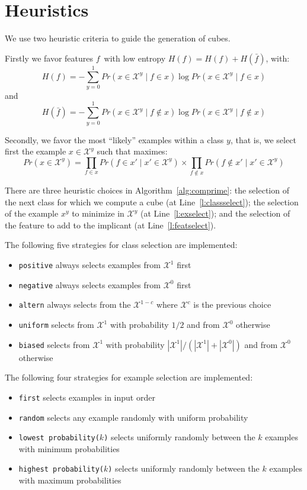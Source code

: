 \documentclass{article}
\newcommand{\setex}[1]{\ensuremath{{\mathcal X}^{#1}}\xspace}
\newcommand{\posex}{{\setex{1}}\xspace}
\newcommand{\negex}{{\setex{0}}\xspace}
\newcommand{\feat}{\ensuremath{f}}
\newcommand{\var}{\ensuremath{x}}
\newcommand{\ex}{\ensuremath{\var}}
\newcommand{\entropy}[1]{\ensuremath{{H}({#1})}\xspace}
\newcommand{\probability}[1]{\ensuremath{{Pr}({#1})}\xspace}
\begin{document}
\section*{Heuristics}

We use two heuristic criteria to guide the generation of cubes. 

Firstly we favor features \feat\ with low entropy $\entropy{\feat} = \entropy{\feat} + \entropy{\bar{\feat}}$, with:
\[
\entropy{\feat} = - \sum_{y=0}^1 \probability{x \in \setex{y} \mid \feat \in x} \log \probability{x \in \setex{y} \mid \feat \in x}
\]
and 
\[
\entropy{\bar{\feat}} = - \sum_{y=0}^1 \probability{x \in \setex{y} \mid \feat \not\in x} \log \probability{x \in \setex{y} \mid \feat \not\in x}
\]

Secondly, we favor the most ``likely'' examples within a class $y$, that is, we select first the example $x \in \setex{y}$ such that maximes:
\[
\probability{x \in \setex{y}} = \prod_{\feat \in x} \probability{\feat \in x' \mid x' \in \setex{y}} \times \prod_{\feat \not\in x} \probability{\feat \not\in x' \mid x' \in \setex{y}} 
\]



There are three heuristic choices in Algorithm~\ref{alg:comprime}: 
the selection of the next class for which we compute a cube (at Line~\ref{l:classselect}); the selection of the example $\ex^y$ to minimize in $\setex{y}$ (at Line~\ref{l:exselect}); and the selection of the feature to add to the implicant (at Line~\ref{l:featselect}).


The following five strategies for class selection are implemented:
\begin{itemize}
	\item \texttt{positive} always selects examples from $\posex$ first
		\item \texttt{negative} always selects examples from $\negex$ first
	\item \texttt{altern} always selects from the $\setex{1-c}$ where $\setex{c}$ is the previous choice
\item \texttt{uniform} selects from $\posex$ with probability $1/2$ and from $\negex$ otherwise
\item \texttt{biased} selects from $\posex$ with probability $|\posex|/(|\posex|+|\negex|)$ and from $\negex$ otherwise
\end{itemize}


The following four strategies for example selection are implemented:
\begin{itemize}
	\item \texttt{first} selects examples in input order
	\item \texttt{random} selects any example randomly with uniform probability
	\item \texttt{lowest probability($k$)} selects uniformly randomly between the $k$ examples with minimum probabilities
	\item \texttt{highest probability($k$)} selects uniformly randomly between the $k$ examples with maximum probabilities
\end{itemize}
\end{document}
